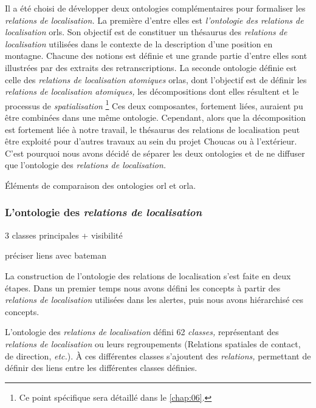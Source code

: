 Il a été choisi de développer deux ontologies complémentaires pour
formaliser les \emph{relations de localisation.} La première d'entre
elles est \emph{l'ontologie des relations de localisation}
\acp{orl}. Son objectif est de constituer un thésaurus des
\emph{relations de localisation} utilisées dans le contexte de la
description d'une position en montagne. Chacune des notions est
définie et une grande partie d'entre elles sont illustrées par des
extraits des retranscriptions. La seconde ontologie définie est celle
des \emph{relations de localisation atomiques} \acp{orla}, dont
l'objectif est de définir les \emph{relations de localisation
  atomiques,} les décompositions dont elles résultent et le processus
de \emph{spatialisation} \footnote{Ce point spécifique sera détaillé
  dans le \autoref{chap:06}.} Ces deux composantes, fortement liées,
auraient pu être combinées dans une même ontologie. Cependant, alors
que la décomposition est fortement liée à notre travail, le thésaurus
des relations de localisation peut être exploité pour d'autres travaux
au sein du projet Choucas ou à l'extérieur. C'est pourquoi nous avons
décidé de séparer les deux ontologies et de ne diffuser que
l'ontologie des \emph{relations de localisation.}

\begin{table}
  \centering
  
  \caption{Éléments de comparaison des ontologies \ac{orl} et
    \ac{orla}.}
  \label{tab:orl_vs_orla}
\end{table}

\subsubsection{L'ontologie des \emph{relations de localisation}}

3 classes principales + visibilité

préciser liens avec bateman

La construction de l'ontologie des relations de localisation s'est
faite en deux étapes. Dans un premier temps nous avons défini les
concepts à partir des \emph{relations de localisation} utilisées dans
les alertes, puis nous avons hiérarchisé ces concepts.


L'ontologie des \emph{relations de localisation} défini 62
\emph{classes,} représentant des \emph{relations de localisation} ou
leurs regroupements (\eg Relations spatiales de contact, de direction,
\emph{etc.}). À ces différentes classes s'ajoutent des
\emph{relations,} permettant de définir des liens entre les
différentes classes définies.

